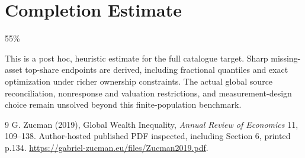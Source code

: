 \documentclass[11pt]{article}
\begin{document}
\section{Completion Estimate}
55\%

This is a post hoc, heuristic estimate for the full catalogue target.
Sharp missing-asset top-share endpoints are derived, including fractional quantiles and exact optimization under richer ownership constraints. The actual global source reconciliation, nonresponse and valuation restrictions, and measurement-design choice remain unsolved beyond this finite-population benchmark.

\begin{thebibliography}{9}
 G. Zucman (2019), Global Wealth Inequality, \emph{Annual Review of Economics} 11, 109--138. Author-hosted published PDF inspected, including Section 6, printed p.134. \url{https://gabriel-zucman.eu/files/Zucman2019.pdf}.
\end{thebibliography}
\end{document}

